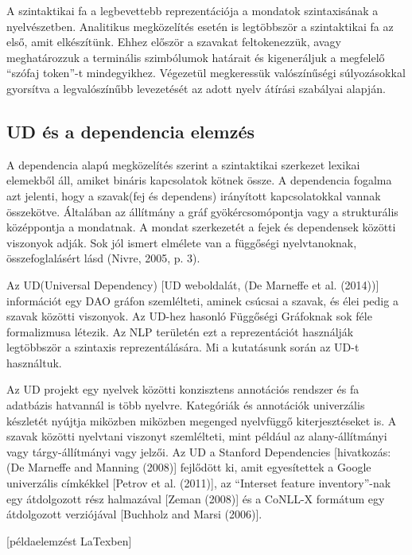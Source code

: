A szintaktikai fa a legbevettebb reprezentációja a mondatok szintaxisának a nyelvészetben. Analitikus megközelítés esetén is legtöbbször a szintaktikai fa az első, amit elkészítünk. Ehhez először a szavakat feltokenezzük, avagy meghatározzuk a terminális szimbólumok határait és kigeneráljuk a megfelelő “szófaj token”-t mindegyikhez. Végezetül megkeressük valószínűségi súlyozásokkal gyorsítva a legvalószínűbb levezetését az adott nyelv átírási szabályai alapján.


\subsection{UD és a dependencia elemzés}
A dependencia alapú megközelítés szerint a szintaktikai szerkezet lexikai elemekből áll, amiket bináris kapcsolatok kötnek össze. A dependencia fogalma azt jelenti, hogy a szavak(fej és dependens) irányított kapcsolatokkal vannak összekötve.  Általában az állítmány a gráf gyökércsomópontja vagy a strukturális középpontja a mondatnak. A mondat szerkezetét a fejek és dependensek közötti viszonyok adják. Sok jól ismert elmélete van a függőségi nyelvtanoknak, összefoglalásért lásd (Nivre, 2005, p.  3).

Az UD(Universal Dependency) [UD weboldalát, (De Marneffe et al. (2014))] információt egy DAO gráfon szemlélteti, aminek csúcsai a szavak, és élei pedig a szavak közötti viszonyok. Az UD-hez hasonló Függőségi Gráfoknak sok féle formalizmusa létezik. Az NLP területén ezt a reprezentációt használják legtöbbször a szintaxis reprezentálására. Mi a kutatásunk során az UD-t használtuk.

Az UD projekt egy nyelvek közötti konzisztens annotációs rendszer és fa adatbázis hatvannál is több nyelvre. Kategóriák és annotációk univerzális készletét nyújtja miközben miközben megenged nyelvfüggő kiterjesztéseket is. A szavak közötti nyelvtani viszonyt szemlélteti, mint például az alany-állítmányi vagy tárgy-állítmányi vagy jelzői. Az UD a Stanford Dependencies [hivatkozás: (De Marneffe and Manning (2008)] fejlődött ki, amit egyesítettek a Google univerzális címkékkel [Petrov et al. (2011)], az “Interset feature inventory”-nak egy átdolgozott rész halmazával [Zeman (2008)] és  a CoNLL-X formátum egy átdolgozott verziójával [Buchholz and
Marsi (2006)].

[példaelemzést LaTexben]

